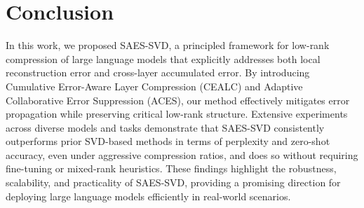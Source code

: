 \vspace{-3mm}
\section{Conclusion}
\vspace{-2mm}
In this work, we proposed SAES-SVD, a principled framework for low-rank compression of large language models that explicitly addresses both local reconstruction error and cross-layer accumulated error. By introducing Cumulative Error-Aware Layer Compression (CEALC) and Adaptive Collaborative Error Suppression (ACES), our method effectively mitigates error propagation while preserving critical low-rank structure. Extensive experiments across diverse models and tasks demonstrate that SAES-SVD consistently outperforms prior SVD-based methods in terms of perplexity and zero-shot accuracy, even under aggressive compression ratios, and does so without requiring fine-tuning or mixed-rank heuristics. These findings highlight the robustness, scalability, and practicality of SAES-SVD, providing a promising direction for deploying large language models efficiently in real-world scenarios.




